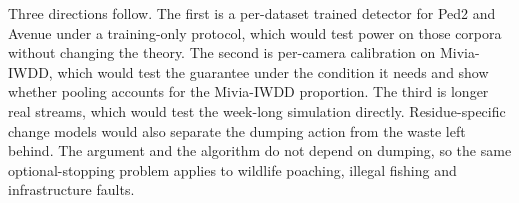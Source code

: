 Three directions follow. The first is a per-dataset trained detector for Ped2 and Avenue under a training-only protocol, which would test power on those corpora without changing the theory. The second is per-camera calibration on Mivia-IWDD, which would test the guarantee under the condition it needs and show whether pooling accounts for the Mivia-IWDD proportion. The third is longer real streams, which would test the week-long simulation directly. Residue-specific change models would also separate the dumping action from the waste left behind. The argument and the algorithm do not depend on dumping, so the same optional-stopping problem applies to wildlife poaching, illegal fishing and infrastructure faults.
